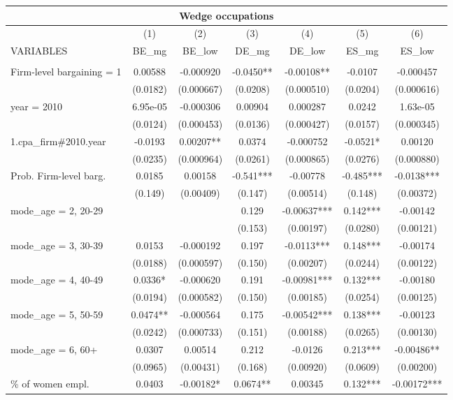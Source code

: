 \documentclass[]{article}
\begin{document}
\begin{tabular}{lcccccc}
\multicolumn{7}{c}{Wedge occupations} \\ \hline
 & (1) & (2) & (3) & (4) & (5) & (6) \\
VARIABLES & BE\_mg & BE\_low & DE\_mg & DE\_low & ES\_mg & ES\_low \\ \hline
 &  &  &  &  &  &  \\
Firm-level bargaining = 1 & 0.00588 & -0.000920 & -0.0450** & -0.00108** & -0.0107 & -0.000457 \\
 & (0.0182) & (0.000667) & (0.0208) & (0.000510) & (0.0204) & (0.000616) \\
year = 2010 & 6.95e-05 & -0.000306 & 0.00904 & 0.000287 & 0.0242 & 1.63e-05 \\
 & (0.0124) & (0.000453) & (0.0136) & (0.000427) & (0.0157) & (0.000345) \\
1.cpa\_firm\#2010.year & -0.0193 & 0.00207** & 0.0374 & -0.000752 & -0.0521* & 0.00120 \\
 & (0.0235) & (0.000964) & (0.0261) & (0.000865) & (0.0276) & (0.000880) \\
Prob. Firm-level barg. & 0.0185 & 0.00158 & -0.541*** & -0.00778 & -0.485*** & -0.0138*** \\
 & (0.149) & (0.00409) & (0.147) & (0.00514) & (0.148) & (0.00372) \\
mode\_age = 2, 20-29 &  &  & 0.129 & -0.00637*** & 0.142*** & -0.00142 \\
 &  &  & (0.153) & (0.00197) & (0.0280) & (0.00121) \\
mode\_age = 3, 30-39 & 0.0153 & -0.000192 & 0.197 & -0.0113*** & 0.148*** & -0.00174 \\
 & (0.0188) & (0.000597) & (0.150) & (0.00207) & (0.0244) & (0.00122) \\
mode\_age = 4, 40-49 & 0.0336* & -0.000620 & 0.191 & -0.00981*** & 0.132*** & -0.00180 \\
 & (0.0194) & (0.000582) & (0.150) & (0.00185) & (0.0254) & (0.00125) \\
mode\_age = 5, 50-59 & 0.0474** & -0.000564 & 0.175 & -0.00542*** & 0.138*** & -0.00123 \\
 & (0.0242) & (0.000733) & (0.151) & (0.00188) & (0.0265) & (0.00130) \\
mode\_age = 6, 60+ & 0.0307 & 0.00514 & 0.212 & -0.0126 & 0.213*** & -0.00486** \\
 & (0.0965) & (0.00431) & (0.168) & (0.00920) & (0.0609) & (0.00200) \\
\% of women empl. & 0.0403 & -0.00182* & 0.0674** & 0.00345 & 0.132*** & -0.00172*** \\

\end{tabular}
\end{document}
